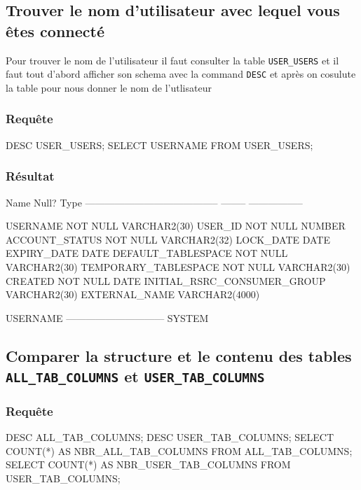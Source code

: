 \documentclass[•]{article}
\begin{document}
\subsection{Trouver le nom d’utilisateur avec lequel vous êtes connecté}

Pour trouver le nom de l'utilisateur il faut consulter la table \texttt{USER\_USERS} et il faut tout d'abord afficher son schema avec la command \texttt{DESC} et après on cosulute la table pour nous donner le nom de l'utlisateur

\subsubsection{Requête}
\begin{sql}
DESC USER\_USERS;
SELECT USERNAME FROM USER\_USERS; 
\end{sql}
\subsubsection{Résultat}
\begin{sql}
 Name                                      Null?    Type
 ----------------------------------------- -------- -----------------

 USERNAME                                  NOT NULL VARCHAR2(30)
 USER_ID                                   NOT NULL NUMBER
 ACCOUNT_STATUS                            NOT NULL VARCHAR2(32)
 LOCK_DATE                                          DATE
 EXPIRY_DATE                                        DATE
 DEFAULT_TABLESPACE                        NOT NULL VARCHAR2(30)
 TEMPORARY_TABLESPACE                      NOT NULL VARCHAR2(30)
 CREATED                                   NOT NULL DATE
 INITIAL_RSRC_CONSUMER_GROUP                        VARCHAR2(30)
 EXTERNAL_NAME                                      VARCHAR2(4000)

 USERNAME
 ------------------------------
 SYSTEM
\end{sql}

\subsection{Comparer la structure et le contenu des tables \texttt{ALL\_TAB\_COLUMNS} et \texttt{USER\_TAB\_COLUMNS}}
\subsubsection{Requête}
\begin{sql}
DESC ALL_TAB_COLUMNS;
DESC USER_TAB_COLUMNS;
SELECT COUNT(*) AS NBR_ALL_TAB_COLUMNS FROM ALL_TAB_COLUMNS;
SELECT COUNT(*) AS NBR_USER_TAB_COLUMNS FROM USER_TAB_COLUMNS;
\end{sql}
\end{document}
